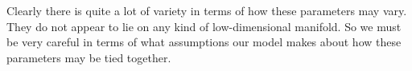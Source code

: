 Clearly there is quite a lot of variety in terms of how these parameters may vary.  They do not appear to lie on any kind of low-dimensional manifold.  So we must be very careful in terms of what assumptions our model makes about how these parameters may be tied together.  

% 
% 








































